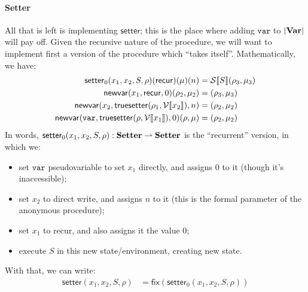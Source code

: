 \documentclass{../../psv}
\newcommand{\Var}{\mathbf{Var}}
\newcommand{\Setter}{\mathbf{Setter}}
\newcommand{\Vareval}[1]{\mathcal{V}\eval{#1}}
\newcommand{\Stmteval}[1]{\mathcal{S}\eval{#1}}
\begin{document}
  \paragraph{Setter} All that is left is implementing $\mathsf{setter}$; this is the place where adding $\mathtt{var}$ to $\domain{\Var}$ will pay off. Given the recursive nature of the procedure, we will want to implement first a version of the procedure which ``takes itself''. Mathematically, we have:
  \begin{align*}
    \mathsf{setter}_0(x_1, x_2, S, \rho)(\mathsf{recur})(\mu)(n) &= \Stmteval{S}(\rho_3, \mu_3)\\
    \mathsf{newvar}(x_1, \mathsf{recur}, 0)(\rho_2, \mu_2) &= (\rho_3, \mu_3)\\
    \mathsf{newvar}(x_2, \mathsf{truesetter}(\rho_1, \Vareval{x_2}), n) &= (\rho_2, \mu_2)\\
    \mathsf{newvar}(\mathtt{var}, \mathsf{truesetter}(\rho, \Vareval{x_1}), 0)(\rho, \mu) &= (\rho_2, \mu_2)
  \end{align*}
  In words, $\mathsf{setter}_0(x_1, x_2, S, \rho): \Setter \pto \Setter$ is the ``recurrent'' version, in which we:
  \begin{itemize}
    \item set $\mathtt{var}$ pseudovariable to set $x_1$ directly, and assigns $0$ to it (though it's inaccessible);
    \item set $x_2$ to direct write, and assigns $n$ to it (this is the formal parameter of the anonymous procedure);
    \item set $x_1$ to recur, and also assigns it the value $0$;
    \item execute $S$ in this new state/environment, creating new state.
  \end{itemize}
  With that, we can write:
  \begin{align*}
    \mathsf{setter}(x_1, x_2, S, \rho) &= \mathsf{fix}(\mathsf{setter}_0(x_1, x_2, S, \rho))
  \end{align*}
\end{document}

